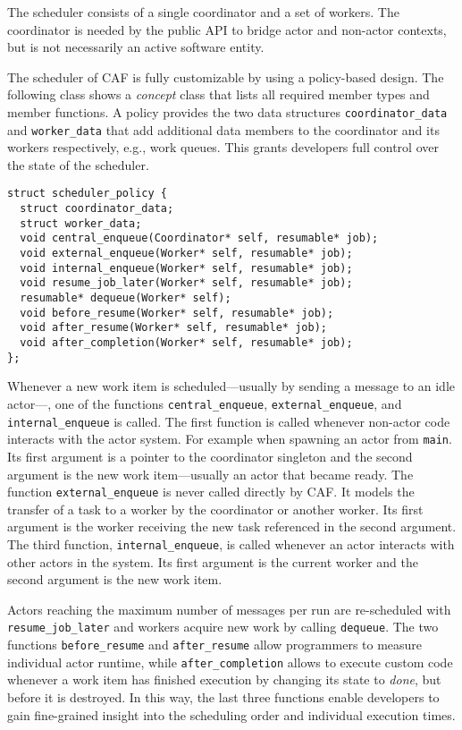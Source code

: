 The scheduler consists of a single coordinator and a set of workers. The
coordinator is needed by the public API to bridge actor and non-actor contexts,
but is not necessarily an active software entity.

The scheduler of CAF is fully customizable by using a policy-based design. The
following class shows a \emph{concept} class that lists all required member
types and member functions. A policy provides the two data structures
\lstinline^coordinator_data^ and \lstinline^worker_data^ that add additional
data members to the coordinator and its workers respectively, e.g., work
queues. This grants developers full control over the state of the scheduler.

\begin{lstlisting}
struct scheduler_policy {
  struct coordinator_data;
  struct worker_data;
  void central_enqueue(Coordinator* self, resumable* job);
  void external_enqueue(Worker* self, resumable* job);
  void internal_enqueue(Worker* self, resumable* job);
  void resume_job_later(Worker* self, resumable* job);
  resumable* dequeue(Worker* self);
  void before_resume(Worker* self, resumable* job);
  void after_resume(Worker* self, resumable* job);
  void after_completion(Worker* self, resumable* job);
};
\end{lstlisting}

Whenever a new work item is scheduled---usually by sending a message to an idle
actor---, one of the functions \lstinline^central_enqueue^,
\lstinline^external_enqueue^, and \lstinline^internal_enqueue^ is called. The
first function is called whenever non-actor code interacts with the actor
system. For example when spawning an actor from \lstinline^main^. Its first
argument is a pointer to the coordinator singleton and the second argument is
the new work item---usually an actor that became ready. The function
\lstinline^external_enqueue^ is never called directly by CAF. It models the
transfer of a task to a worker by the coordinator or another worker. Its first
argument is the worker receiving the new task referenced in the second
argument. The third function, \lstinline^internal_enqueue^, is called whenever
an actor interacts with other actors in the system. Its first argument is the
current worker and the second argument is the new work item.

Actors reaching the maximum number of messages per run are re-scheduled with
\lstinline^resume_job_later^ and workers acquire new work by calling
\lstinline^dequeue^. The two functions \lstinline^before_resume^ and
\lstinline^after_resume^ allow programmers to measure individual actor runtime,
while \lstinline^after_completion^ allows to execute custom code whenever a
work item has finished execution by changing its state to \emph{done}, but
before it is destroyed. In this way, the last three functions enable developers
to gain fine-grained insight into the scheduling order and individual execution
times.

